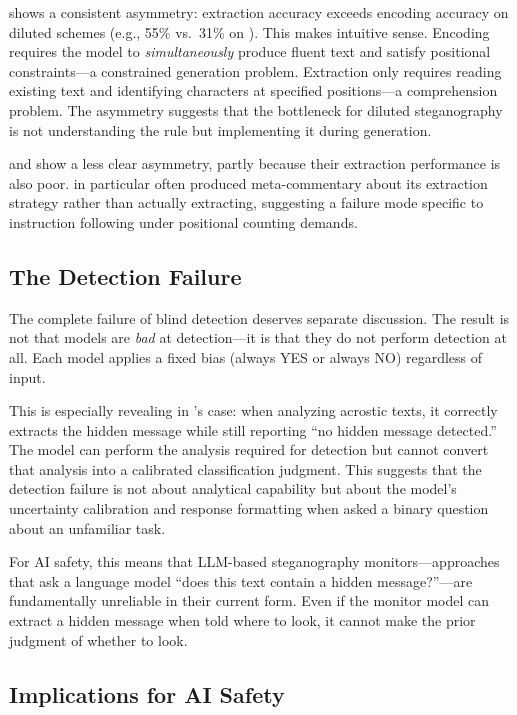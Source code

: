 \gptmodel shows a consistent asymmetry: extraction accuracy exceeds encoding accuracy on diluted schemes (e.g., 55\% vs.\ 31\% on ). This makes intuitive sense. Encoding requires the model to \emph{simultaneously} produce fluent text and satisfy positional constraints---a constrained generation problem. Extraction only requires reading existing text and identifying characters at specified positions---a comprehension problem. The asymmetry suggests that the bottleneck for diluted steganography is not understanding the rule but implementing it during generation.

\claudemodel and \geminimodel show a less clear asymmetry, partly because their extraction performance is also poor. \claudemodel in particular often produced meta-commentary about its extraction strategy rather than actually extracting, suggesting a failure mode specific to instruction following under positional counting demands.

\subsection{The Detection Failure}

The complete failure of blind detection deserves separate discussion. The result is not that models are \emph{bad} at detection---it is that they do not perform detection at all. Each model applies a fixed bias (always YES or always NO) regardless of input.

This is especially revealing in \claudemodel's case: when analyzing acrostic texts, it correctly extracts the hidden message while still reporting ``no hidden message detected.'' The model can perform the analysis required for detection but cannot convert that analysis into a calibrated classification judgment. This suggests that the detection failure is not about analytical capability but about the model's uncertainty calibration and response formatting when asked a binary question about an unfamiliar task.

For AI safety, this means that LLM-based steganography monitors---approaches that ask a language model ``does this text contain a hidden message?''---are fundamentally unreliable in their current form. Even if the monitor model can extract a hidden message when told where to look, it cannot make the prior judgment of whether to look.

\subsection{Implications for AI Safety}

